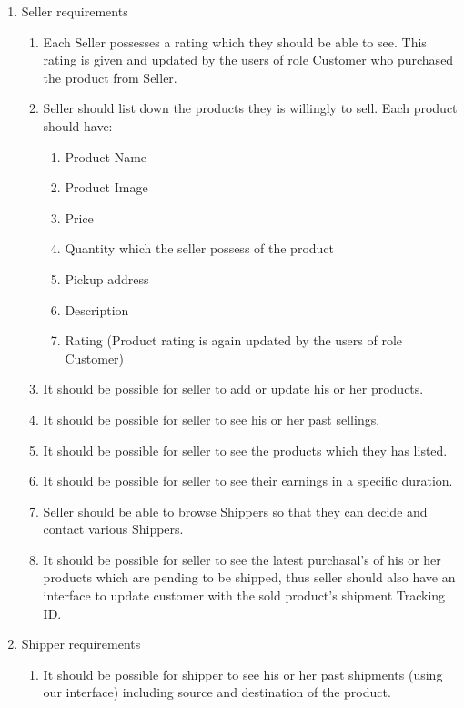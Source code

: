 \documentclass[a4paper,12pt]{article}
\begin{document}
\begin{enumerate}
  \item Seller requirements
  \begin{enumerate}
    \item Each Seller possesses a rating which they should be able to see. This rating is given and updated by the users of role Customer who purchased the product from Seller.
    \item Seller should list down the products they is willingly to sell. Each product should have:
    \begin{enumerate}
      \item Product Name
      \item Product Image
      \item Price 
      \item Quantity which the seller possess of the product
      \item Pickup address
      \item Description
      \item Rating (Product rating is again updated by the users of role Customer)
    \end{enumerate}
    \item It should be possible for seller to add or update his or her products.
    \item It should be possible for seller to see his or her past sellings.
    \item It should be possible for seller to see the products which they has listed. 
    \item It should be possible for seller to see their earnings in a specific duration. 
    \item Seller should be able to browse Shippers so that they can decide and contact various Shippers.
    \item It should be possible for seller to see the latest purchasal's of his or her products which are pending to be shipped, thus seller should also have an interface to update customer with the sold product's shipment Tracking ID.
  \end{enumerate}
  \item Shipper requirements
    \begin{enumerate}
      \item It should be possible for shipper to see his or her past shipments (using our interface) including source and destination of the product.
    \end{enumerate}
\end{enumerate}
\end{document}
